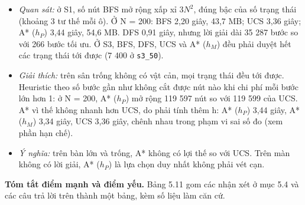 \begin{itemize}
\tightlist
\item
  \emph{Quan sát:} ở S1, số nút BFS mở rộng xấp xỉ \(3N^2\), đúng bậc của số trạng thái (khoảng 3 tư thế mỗi ô). Ở N = 200: BFS 2,20 giây, 43,7 MB; UCS 3,36 giây; A* (\(h_P\)) 3,44 giây, 54,6 MB. DFS 0,91 giây, nhưng lời giải dài 35 287 bước so với 266 bước tối ưu. Ở S3, BFS, DFS, UCS và A* (\(h_M\)) đều phải duyệt hết các trạng thái tới được (7 400 ở \texttt{s3\_\allowbreak{}50}).
\item
  \emph{Giải thích:} trên sân trống không có vật cản, mọi trạng thái đều tới được. Heuristic theo số bước gần như không cắt được nút nào khi chi phí mỗi bước lớn hơn 1: ở N = 200, A* (\(h_P\)) mở rộng 119 597 nút so với 119 599 của UCS. A* vì thế không nhanh hơn UCS, do phải tính thêm h: A* (\(h_P\)) 3,44 giây, A* (\(h_M\)) 3,34 giây, UCS 3,36 giây, chênh nhau trong phạm vi sai số đo (xem phần hạn chế).
\item
  \emph{Ý nghĩa:} trên bàn lớn và trống, A* không có lợi thế so với UCS. Trên màn không có lời giải, A* (\(h_P\)) là lựa chọn duy nhất không phải vét cạn.
\end{itemize}

\textbf{Tóm tắt điểm mạnh và điểm yếu.} Bảng 5.11 gom các nhận xét ở mục 5.4 và các câu trả lời trên thành một bảng, kèm số liệu làm căn cứ.


